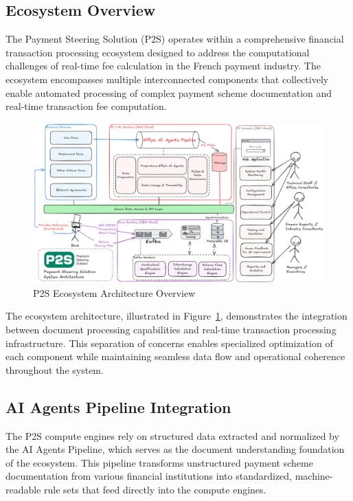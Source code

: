 \subsection{Ecosystem Overview}

The Payment Steering Solution (P2S) operates within a comprehensive financial transaction processing ecosystem designed to address the computational challenges of real-time fee calculation in the French payment industry. The ecosystem encompasses multiple interconnected components that collectively enable automated processing of complex payment scheme documentation and real-time transaction fee computation.

\begin{figure}[H]
    \centering
    \includegraphics[width=\textwidth]{img/arch/new_archi.png}
    \caption{P2S Ecosystem Architecture Overview}
    \label{fig:solution_architecture}
\end{figure}

The ecosystem architecture, illustrated in Figure~\ref{fig:solution_architecture}, demonstrates the integration between document processing capabilities and real-time transaction processing infrastructure. This separation of concerns enables specialized optimization of each component while maintaining seamless data flow and operational coherence throughout the system.

\subsection{AI Agents Pipeline Integration}

The P2S compute engines rely on structured data extracted and normalized by the AI Agents Pipeline, which serves as the document understanding foundation of the ecosystem. This pipeline transforms unstructured payment scheme documentation from various financial institutions into standardized, machine-readable rule sets that feed directly into the compute engines.

